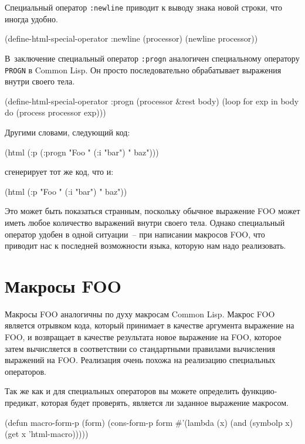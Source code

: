 Специальный оператор \lstinline{:newline} приводит к выводу знака новой строки, что иногда удобно.

\begin{myverb}
(define-html-special-operator :newline (processor)
  (newline processor))
\end{myverb}

В~заключение специальный оператор \lstinline{:progn} аналогичен специальному оператору
\lstinline{PROGN} в Common Lisp.  Он просто последовательно обрабатывает выражения внутри
свое\-го тела.

\begin{myverb}
(define-html-special-operator :progn (processor &rest body)
  (loop for exp in body do (process processor exp)))
\end{myverb}

Другими словами, следующий код:

\begin{myverb}
(html (:p (:progn "Foo " (:i "bar") " baz")))
\end{myverb}

сгенерирует тот же код, что и:

\begin{myverb}
(html (:p "Foo " (:i "bar") " baz"))
\end{myverb}

Это может быть показаться странным, поскольку обычное выражение FOO может иметь любое
количество выражений внутри своего тела.  Однако специальный оператор удобен в одной
ситуации~-- при написании макросов FOO, что приводит нас к последней возможности языка,
которую нам надо реализовать.

\section{Макросы FOO}

Макросы FOO аналогичны по духу макросам Common Lisp.  Макрос FOO является отрывком кода,
который принимает в качестве аргумента выражение на FOO, и возвращает в качестве
результата новое выражение на FOO, которое затем вычисляется в соответствии со
стандартными правилами вычисления выражений на FOO.  Реализация очень похожа на реализацию
специальных операторов.

Так же как и для специальных операторов вы можете определить функцию-предикат, которая
будет проверять, является ли заданное выражение макросом.

\begin{myverb}
(defun macro-form-p (form)
  (cons-form-p form #'(lambda (x) (and (symbolp x) (get x 'html-macro)))))
\end{myverb}

